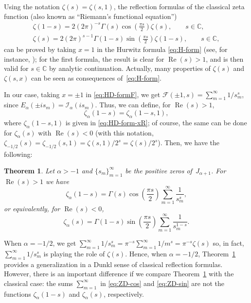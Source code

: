\documentclass[a4paper]{amsart}
\newcommand{\C}{\mathbb{C}}
\newcommand{\I}{\mathcal{I}}
\newcommand{\Ea}{E_{\alpha}}
\renewcommand{\Re}{\operatorname{Re}}
\theoremstyle{plain}
\newtheorem{theorem}{Theorem}[section]
\theoremstyle{definition}
\theoremstyle{remark}
\numberwithin{equation}{section}
\begin{document}
Using the notation $\zeta(s) = \zeta(s,1)$, the reflection formulas of the classical zeta function (also known as ``Riemann's functional equation'')
\begin{align*}
\zeta(1-s) = 2(2\pi)^{-s}\Gamma(s) \cos{\left(\frac{\pi s}{2}\right)}\zeta(s),
\qquad s \in \C,\\
\zeta(s) = 2(2\pi)^{s-1}\Gamma(1-s) \sin{\left(\frac{\pi s}{2}\right)}\zeta(1-s),
\qquad s \in \C,
\end{align*}
can be proved by taking $x=1$ in the Hurwitz formula \eqref{eq:H-form} 
(see, for instance, \cite[\S\,12.8, Theorem~12.7]{Ap-ANT}); 
for the first formula, the result is clear for $\Re(s)>1$, and is then valid for $s \in \C$ by analytic continuation. Actually, many properties of $\zeta(s)$ and $\zeta(s,x)$ can be seen as consequences of~\eqref{eq:H-form}. 

In our case, taking $x= \pm1$ in \eqref{eq:HD-formF}, we get $\mathcal{F}(\pm1,s) = \sum_{m=1}^{\infty} {1}/{s_m^s}$, 
since $\Ea(\pm i s_m) = \I_{\alpha}(i s_m)$.
Thus, we can define, for $\Re(s)>1$,
\begin{equation}
\label{eq:zetaa1-s}
  \zeta_{\alpha}(1-s) = \zeta_{\alpha}(1-s,1),
\end{equation}
where $\zeta_{\alpha}(1-s,1)$ is given in \eqref{eq:HD-form-xR}; of course, the same can be done for $\zeta_{\alpha}(s)$ with $\Re(s)<0$ (with this notation, $\zeta_{-1/2}(s) = \zeta_{-1/2}(s,1) = \zeta(s,1)/2^s = \zeta(s)/2^s$). Then, we have the following:

\begin{theorem}
\label{teo:ref-form}
Let $\alpha>-1$ and $\{s_m\}_{m=1}^{\infty}$ be the positive zeros of~$J_{\alpha+1}$.
For $\Re(s)>1$ we have
\begin{equation}
\label{eq:ZD-cos}
    \zeta_{\alpha}(1-s) = \Gamma(s) \cos{\left(\frac{\pi s}{2}\right)} 
    \sum_{m=1}^{\infty} \frac{1}{s_m^s},
\end{equation}
or equivalently, for $\Re(s)<0$,
\begin{equation}
\label{eq:ZD-sin}
    \zeta_{\alpha}(s) = \Gamma(1-s) \sin\left(\frac{\pi s}{2}\right) 
    \sum_{m=1}^{\infty} \frac{1}{s_m^{1-s}}.
\end{equation}
\end{theorem}

When $\alpha=-1/2$, we get $\sum_{m=1}^{\infty}1/s_m^s = \pi^{-s}\sum_{m=1}^{\infty}1/m^s = \pi^{-s}\zeta(s)$ so, in fact, $\sum_{m=1}^{\infty}1/s_m^s$ is playing the role of $\zeta(s)$. Hence, when $\alpha = -1/2$, Theorem~\ref{teo:ref-form} provides a generalization in a Dunkl sense of classical reflection formulas. However, there is an important difference if we compare Theorem~\ref{teo:ref-form} with the classical case: the sums $\sum_{m=1}^{\infty}$ in \eqref{eq:ZD-cos} and \eqref{eq:ZD-sin} are not the functions $\zeta_{\alpha}(1-s)$ and $\zeta_{\alpha}(s)$, respectively.
\end{document}
